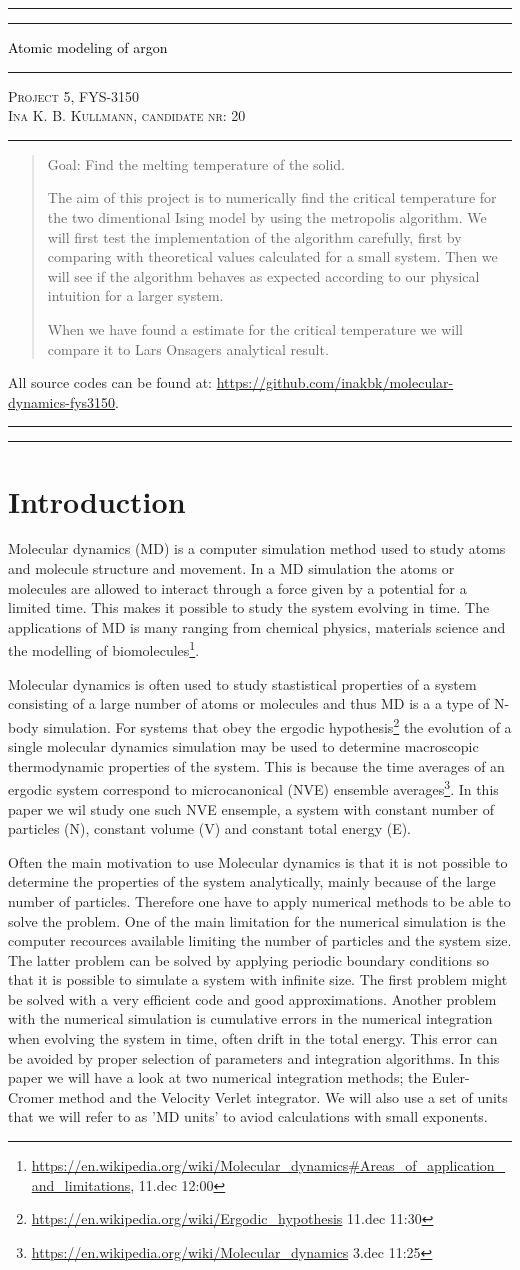\documentclass[11pt,a4wide]{article}
\newcommand*{\titleAT}{\begingroup %
\newlength{\drop} %
\drop=0.1\textheight %

\rule{\textwidth}{1pt}\par %
\vspace{2pt}\vspace{-\baselineskip} %
\rule{\textwidth}{0.4pt}\par %

\vspace{0.5\drop} %
\centering %
\textcolor{black}{ %
{\Huge Atomic modeling of argon}\\[0.75\baselineskip] %
} 

\vspace{0.25\drop} %
\rule{0.3\textwidth}{0.4pt}\par %
\vspace{0.25\drop} %

{\Large \textsc{Project 5, FYS-3150\\[0.75\baselineskip] \normalsize{Ina K. B. Kullmann, candidate nr: 20}
}}\par %


\vspace{0.25\drop} %
\rule{0.3\textwidth}{0.4pt}\par %
\vspace{0.25\drop} %

\begin{abstract}
Goal: Find the melting temperature of the solid.

The aim of this project is to numerically find the critical temperature for the two dimentional Ising model by using the metropolis algorithm. We will first test the implementation of the algorithm carefully, first by comparing with theoretical values calculated for a small system. Then we will see if the algorithm behaves as expected according to our physical intuition for a larger system.

When we have found a estimate for the critical temperature we will compare it to Lars Onsagers analytical result.

\end{abstract}
\vspace*{0.25\drop} %

\begin{center}
{ \scriptsize \noindent All source codes can be found at: \url{https://github.com/inakbk/molecular-dynamics-fys3150}. }
\end{center}

\rule{\textwidth}{0.4pt}\par %
\vspace{2pt}\vspace{-\baselineskip} %
\rule{\textwidth}{1pt}\par %

\endgroup}
\begin{document}
\titleAT %


\newpage
\tableofcontents
\newpage

\section{Introduction}

Molecular dynamics (MD) is a computer simulation method used to study atoms and molecule structure and movement. In a MD simulation the atoms or molecules are allowed to interact through a force given by a potential for a limited time. This makes it possible to study the system evolving in time. The applications of MD is many ranging from chemical physics, materials science and the modelling of biomolecules\footnote{\url{https://en.wikipedia.org/wiki/Molecular\_dynamics\#Areas\_of\_application\_and\_limitations}, 11.dec 12:00}.

Molecular dynamics is often used to study stastistical properties of a system consisting of a large number of atoms or molecules and thus MD is a a type of N-body simulation. For systems that obey the ergodic hypothesis\footnote{\url{https://en.wikipedia.org/wiki/Ergodic\_hypothesis} 11.dec 11:30} the evolution of a single molecular dynamics simulation may be used to determine macroscopic thermodynamic properties of the system. This is because the time averages of an ergodic system correspond to microcanonical (NVE) ensemble averages\footnote{\url{https://en.wikipedia.org/wiki/Molecular\_dynamics} 3.dec 11:25}. In this paper we wil study one such NVE ensemple, a system with constant number of particles (N), constant volume (V) and constant total energy (E). 

Often the main motivation to use Molecular dynamics is that it is not possible to determine the properties of the system analytically, mainly because of the large number of particles. Therefore one have to apply numerical methods to be able to solve the problem. One of the main limitation for the numerical simulation is the computer recources available limiting the number of particles and the system size. The latter problem can be solved by applying periodic boundary conditions so that it is possible to simulate a system with infinite size. The first problem might be solved with a very efficient code and good approximations. Another problem with the numerical simulation is cumulative errors in the numerical integration when evolving the system in time, often drift in the total energy. This error can be avoided by proper selection of parameters and integration algorithms. In this paper we will have a look at two numerical integration methods; the Euler-Cromer method and the Velocity Verlet integrator. We will also use a set of units that we will refer to as 'MD units' to aviod calculations with small exponents. 
\end{document}

